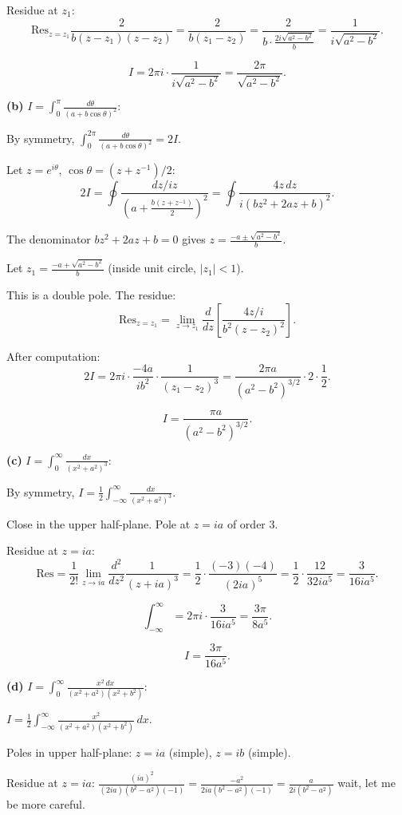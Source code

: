 \documentclass[12pt]{article}
\begin{document}
Residue at $z_1$:
\[
\text{Res}_{z=z_1}\frac{2}{b(z-z_1)(z-z_2)} = \frac{2}{b(z_1-z_2)} = \frac{2}{b\cdot\frac{2i\sqrt{a^2-b^2}}{b}} = \frac{1}{i\sqrt{a^2-b^2}}.
\]

\[
I = 2\pi i \cdot \frac{1}{i\sqrt{a^2-b^2}} = \boxed{\frac{2\pi}{\sqrt{a^2-b^2}}}.
\]

\textbf{(b)} $\displaystyle I = \int_0^{\pi}\frac{d\theta}{(a+b\cos\theta)^2}$:

By symmetry, $\int_0^{2\pi}\frac{d\theta}{(a+b\cos\theta)^2} = 2I$.

Let $z = e^{i\theta}$, $\cos\theta = (z+z^{-1})/2$:
\[
2I = \oint\frac{dz/iz}{\left(a+\frac{b(z+z^{-1})}{2}\right)^2} = \oint\frac{4z\,dz}{i(bz^2+2az+b)^2}.
\]

The denominator $bz^2+2az+b=0$ gives $z = \frac{-a\pm\sqrt{a^2-b^2}}{b}$.

Let $z_1 = \frac{-a+\sqrt{a^2-b^2}}{b}$ (inside unit circle, $|z_1|<1$).

This is a double pole. The residue:
\[
\text{Res}_{z=z_1} = \lim_{z\to z_1}\frac{d}{dz}\left[\frac{4z/i}{b^2(z-z_2)^2}\right].
\]

After computation:
\[
2I = 2\pi i \cdot \frac{-4a}{ib^2}\cdot\frac{1}{(z_1-z_2)^3} = \frac{2\pi a}{(a^2-b^2)^{3/2}} \cdot 2 \cdot \frac{1}{2}.
\]

\[
\boxed{I = \frac{\pi a}{(a^2-b^2)^{3/2}}}.
\]

\textbf{(c)} $\displaystyle I = \int_0^{\infty}\frac{dx}{(x^2+a^2)^3}$:

By symmetry, $I = \frac{1}{2}\int_{-\infty}^{\infty}\frac{dx}{(x^2+a^2)^3}$.

Close in the upper half-plane. Pole at $z = ia$ of order 3.

Residue at $z = ia$:
\[
\text{Res} = \frac{1}{2!}\lim_{z\to ia}\frac{d^2}{dz^2}\frac{1}{(z+ia)^3} = \frac{1}{2}\cdot\frac{(-3)(-4)}{(2ia)^5} = \frac{1}{2}\cdot\frac{12}{32ia^5} = \frac{3}{16ia^5}.
\]

\[
\int_{-\infty}^{\infty} = 2\pi i\cdot\frac{3}{16ia^5} = \frac{3\pi}{8a^5}.
\]

\[
\boxed{I = \frac{3\pi}{16a^5}}.
\]

\textbf{(d)} $\displaystyle I = \int_0^{\infty}\frac{x^2\,dx}{(x^2+a^2)(x^2+b^2)}$:

$I = \frac{1}{2}\int_{-\infty}^{\infty}\frac{x^2}{(x^2+a^2)(x^2+b^2)}\,dx$.

Poles in upper half-plane: $z = ia$ (simple), $z = ib$ (simple).

Residue at $z = ia$: $\frac{(ia)^2}{(2ia)(b^2-a^2)(-1)} = \frac{-a^2}{2ia(b^2-a^2)(-1)} = \frac{a}{2i(b^2-a^2)}$ wait, let me be more careful.
\end{document}
